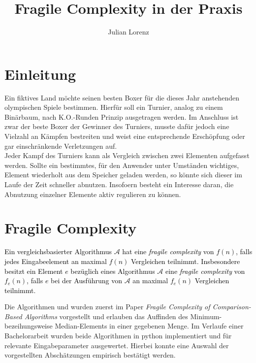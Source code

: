 \documentclass[a1,portrait]{a0poster}
\author{Julian Lorenz}
\title{Fragile Complexity in der Praxis}
\begin{document}
\begin{multicols}{2}

\section{Einleitung}
\noindent
Ein fiktives Land möchte seinen besten Boxer für die dieses Jahr anstehenden olympischen Spiele bestimmen.
Hierfür soll ein Turnier, analog zu einem Binärbaum, nach K.O.-Runden Prinzip ausgetragen werden. Im Anschluss
ist zwar der beste Boxer der Gewinner des Turniers, musste dafür jedoch eine Vielzahl an Kämpfen bestreiten und
weist eine entsprechende Erschöpfung oder gar einschränkende Verletzungen auf.\\[.1cm]
Jeder Kampf des Turniers kann als Vergleich zwischen zwei Elementen aufgefasst werden. 
Sollte ein bestimmtes, für den Anwender unter Umständen wichtiges, Element wiederholt aus dem Speicher geladen 
werden, so könnte sich dieser im Laufe der Zeit schneller abnutzen. Insofoern besteht ein Interesse daran, 
die Abnutzung einzelner Elemente aktiv regulieren zu können. 
\vfill\null
\columnbreak
\section{Fragile Complexity}
\noindent
\vspace{-1.42cm}
\textcolor{goetheblau}{
\begin{definition*}
    \textcolor{black}{
    Ein vergleichsbasierter Algorithmus $\mathcal{A}$ hat eine \textit{fragile complexity} von $f(n)$, falls jedes Eingabeelement an maximal $f(n)$ Vergleichen teilnimmt. Insbesondere besitzt ein Element $e$ bezüglich eines Algorithmus $\mathcal{A}$ eine \textit{fragile complexity} von $f_e(n)$, falls $e$ bei der Ausführung von $\mathcal{A}$ an maximal $f_e(n)$ Vergleichen teilnimmt.}
\end{definition*}
}
\vspace*{0.1cm}

\noindent
Die Algorithmen \Rm und \RM wurden zuerst im Paper 
\textit{Fragile Complexity of Comparison-Based Algorithms} vorgestellt und erlauben 
das Auffinden des Minimum- bezeihungsweise Median-Elements in einer gegebenen Menge. 
Im Verlaufe einer Bachelorarbeit wurden beide Algorithmen in python implementiert 
und für relevante Eingabeparameter ausgewertet. Hierbei konnte eine Auswahl 
der vorgestellten Abschätzungen empirisch bestätigt werden.
\end{multicols}
\end{document}
